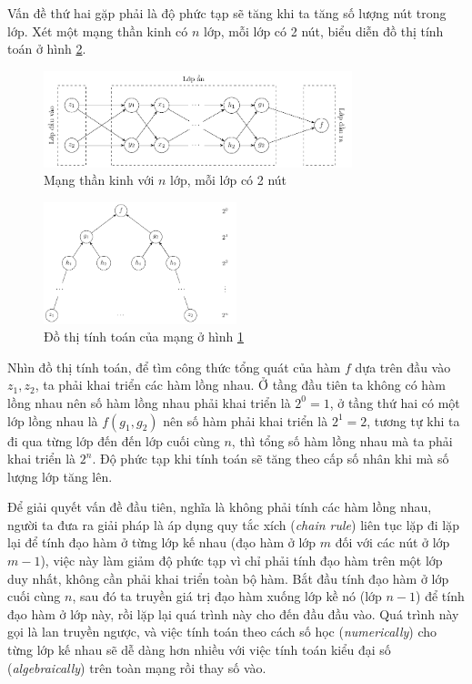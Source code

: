 Vấn đề thứ hai gặp phải là độ phức tạp sẽ tăng khi ta tăng số lượng nút trong lớp. Xét một mạng thần kinh có $n$ lớp, mỗi lớp có 2 nút, biểu diễn đồ thị tính toán ở hình \ref{figure:computational-graph-of-n-layer-2-node-nn}.
\begin{figure}[htb]
    \centering
    \includegraphics[width=0.8\textwidth]{tikz_image/complexity_graph.pdf}
    \caption{Mạng thần kinh với $n$ lớp, mỗi lớp có 2 nút}
    \label{figure:n-layer-2-node-nn}
\end{figure}
\begin{figure}[htb]
    \centering
    \includegraphics[width=0.5\textwidth]{tikz_image/complexity_tree.pdf}
    \caption{Đồ thị tính toán của mạng ở hình \ref{figure:n-layer-2-node-nn}}
    \label{figure:computational-graph-of-n-layer-2-node-nn}
\end{figure}

Nhìn đồ thị tính toán, để tìm công thức tổng quát của hàm $f$ dựa trên đầu vào $z_1,z_2$, ta phải khai triển các hàm lồng nhau. Ở tầng đầu tiên ta không có hàm lồng nhau nên số hàm lồng nhau phải khai triển là $2^0=1$, ở tầng thứ hai có một lớp lồng nhau là $f(g_1,g_2)$ nên số hàm phải khai triển là $2^1=2$, tương tự khi ta đi qua từng lớp đến đến lớp cuối cùng $n$, thì tổng số hàm lồng nhau mà ta phải khai triển là $2^n$. Độ phức tạp khi tính toán sẽ tăng theo cấp số nhân khi mà số lượng lớp tăng lên.

Để giải quyết vấn đề đầu tiên, nghĩa là không phải tính các hàm lồng nhau, người ta đưa ra giải pháp là áp dụng quy tắc xích (\textit{chain rule}) liên tục lặp đi lặp lại để tính đạo hàm ở từng lớp kế nhau (đạo hàm ở lớp $m$ đối với các nút ở lớp $m-1$), việc này làm giảm độ phức tạp vì chỉ phải tính đạo hàm trên một lớp duy nhất, không cần phải khai triển toàn bộ hàm. Bắt đầu tính đạo hàm ở lớp cuối cùng $n$, sau đó ta truyền giá trị đạo hàm xuống lớp kề nó (lớp $n-1$) để tính đạo hàm ở lớp này, rồi lặp lại quá trình này cho đến đầu đầu vào. Quá trình này gọi là lan truyền ngược, và việc tính toán theo cách số học (\textit{numerically}) cho từng lớp kế nhau sẽ dễ dàng hơn nhiều với việc tính toán kiểu đại số (\textit{algebraically}) trên toàn mạng rồi thay số vào.

